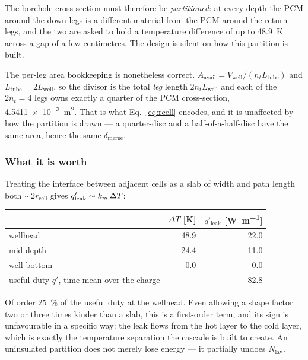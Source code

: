 \noindent
The borehole cross-section must therefore be \emph{partitioned}: at every depth
the PCM around the down legs is a different material from the PCM around the
return legs, and the two are asked to hold a temperature difference of up to
\SI{48.9}{\kelvin} across a gap of a few centimetres. The design is silent on
how this partition is built.

The per-leg area bookkeeping is nonetheless correct.
$A_{\mathrm{avail}}=V_{\mathrm{well}}/(n_{t}L_{\mathrm{tube}})$ and
$L_{\mathrm{tube}}=2L_{\mathrm{well}}$, so the divisor is the total \emph{leg}
length $2n_{t}L_{\mathrm{well}}$ and each of the $2n_{t}=4$ legs owns exactly a
quarter of the PCM cross-section, \SI{4.5411e-3}{\meter\squared}. That is what
Eq.~\eqref{eq:rcell} encodes, and it is unaffected by how the partition is
drawn --- a quarter-disc and a half-of-a-half-disc have the same area, hence the
same $\delta_{\mathrm{merge}}$.

\subsubsection*{What it is worth}

Treating the interface between adjacent cells as a slab of width and path length
both $\sim 2r_{\mathrm{cell}}$ gives $q'_{\mathrm{leak}} \sim k_{m}\,\Delta T$:

\begin{center}
\begin{tabular}{@{}l r r@{}}
\toprule
 & $\Delta T$ [K] & $q'_{\mathrm{leak}}$ [\si{\watt\per\meter}] \\
\midrule
wellhead    & 48.9 & 22.0 \\
mid-depth   & 24.4 & 11.0 \\
well bottom &  0.0 &  0.0 \\
\midrule
useful duty $q'$, time-mean over the charge & & 82.8 \\
\bottomrule
\end{tabular}
\end{center}

\noindent
Of order \SI{25}{\percent} of the useful duty at the wellhead. Even allowing a
shape factor two or three times kinder than a slab, this is a first-order term,
and its sign is unfavourable in a specific way: the leak flows from the hot
layer to the cold layer, which is exactly the temperature separation the cascade
is built to create. An uninsulated partition does not merely lose energy --- it
partially undoes $N_{\mathrm{lay}}$.

